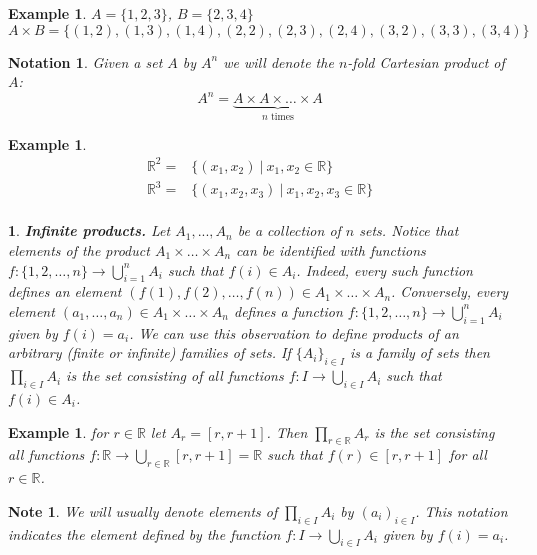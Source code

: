 \documentclass[11pt, letterpaper, oneside]{report}
\theoremstyle{pplain}
\newtheorem{ITERMVALUE THM}[theorem]{Intermediate Value Theorem}
\newtheorem{HEINEBOREL THM}[theorem]{Heine-Borel Theorem}
\newtheorem{UMETR THM}[theorem]{Urysohn Metrization Theorem}
\newtheorem{UMETR2 THM}[theorem]{Urysohn Metrization Theorem (v.2)}
\theoremstyle{ddefinition}
\newtheorem{example}[theorem]{Example}
\newtheorem{notation}[theorem]{Notation}
\newtheorem{note}[theorem]{Note}
\theoremstyle{nnn}
\newtheorem{nn}[theorem]{}
\newtheorem{TDA NN}[theorem]{Topological Data Analysis. }
\theoremstyle{eexercise}
\newcommand{\R}{{\mathbb R}}
\begin{document}
\begin{example} $A = \{1, 2, 3\}$, $B= \{2, 3, 4 \}$
$$A\times  B = \{(1, 2), (1, 3), (1, 4), (2, 2), (2, 3), (2, 4), (3, 2), (3, 3), (3, 4)\}$$
\end{example}


\begin{notation}
Given a set $A$ by $A^{n}$ we will denote the $n$-fold Cartesian product of $A$: 
$$A^{n} =\underbrace{ A\times A \times \dots \times A}_{n \text{ times}}$$
\end{notation}


\begin{example}
\begin{align*}
\R^{2} =  & \{(x_{1}, x_{2}) \ | \ x_{1}, x_{2}\in \R \} \\
\R^{3} =  & \{(x_{1}, x_{2}, x_{3}) \ | \ x_{1}, x_{2}, x_{3} \in \R \} \\
\end{align*}
\end{example}

\begin{nn}\textbf{Infinite products.}
\label{INFINITE PRODUCTS NN}
Let $A_{1}, ..., A_{n}$ be a collection of $n$ sets. Notice that elements of the product 
$A_{1}\times \dots \times A_{n}$ can be identified with functions $f\colon \{ 1, 2, \dots, n\} \to \bigcup_{i=1}^{n} A_{i}$
such that $f(i)\in A_{i}$. Indeed, every such function defines an element 
$(f(1), f(2), \dots, f(n))\in A_{1}\times \dots \times A_{n}$. Conversely,  
every element  $(a_{1}, \dots, a_{n})\in A_{1}\times \dots \times A_{n}$ defines 
a function $f\colon \{1, 2, \dots, n\} \to \bigcup_{i=1}^{n} A_{i}$ given by $f(i) = a_{i}$.
We can use this observation to define  products of an arbitrary (finite or infinite) families of sets.
If $\{A_{i}\}_{i\in I}$ is a family of sets then $\prod_{i\in I} A_{i}$ is the set consisting of all 
functions $f\colon I \to \bigcup_{i\in I} A_{i}$ such that $f(i) \in A_{i}$. 
\end{nn}

\begin{example}
for $r \in \R$ let $A_{r} = [r, r+1]$. Then $\prod_{r\in\R} A_{r}$ is the set consisting all functions 
$f\colon \R \to \bigcup_{r\in \R} [r, r+1] = \R$ such that $f(r)\in [r, r+1]$ for all $r\in \R$. 
\end{example}


\begin{note}
We will usually denote elements of $\prod_{i\in I} A_{i}$ by $(a_{i})_{i\in I}$. This notation indicates 
the element defined by the  function $f\colon I \to \bigcup_{i\in I} A_{i}$ given by $f(i) = a_{i}$. 
\end{note}
\end{document}
